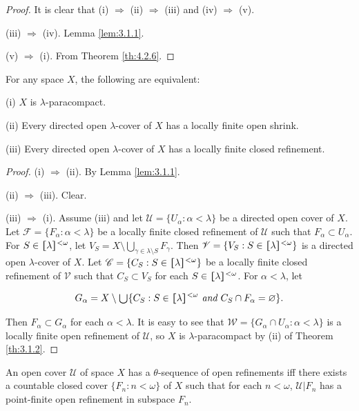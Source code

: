 \documentclass[main.tex]{subfiles}
\begin{document}
\begin{proof}
It is clear that (i) $\Rightarrow$ (ii) $\Rightarrow$ (iii) and (iv) $\Rightarrow$ (v).

(iii) $\Rightarrow$ (iv). Lemma \ref{lem:3.1.1}.

(v) $\Rightarrow$ (i). From Theorem \ref{th:4.2.6}. %
\end{proof} 

{\theorem{}  \label{th:3.1.3} 
For any space $X$, the following are equivalent:

\textup{(i)} $X$ is $\lambda$-paracompact.

\textup{(ii)} Every directed open $\lambda$-cover of $X$ has a locally finite open shrink.

\textup{(iii)} Every directed open $\lambda$-cover of $X$ has a locally finite closed refinement.
}

\begin{proof}
(i) $\Rightarrow$ (ii). By Lemma \ref{lem:3.1.1}.

(ii) $\Rightarrow$ (iii). Clear.

(iii) $\Rightarrow$ (i). Assume (iii) and let $\mathscr{U} = \{U_\alpha: \alpha < \lambda\}$ 
be a directed open cover of $X$. Let 
$\mathscr{F} = \{F_\alpha: \alpha < \lambda\}$ be a locally finite closed refinement of 
$\mathscr{U}$ such that $F_\alpha \subset U_\alpha$. 
For $S \in \hstretch{1.8}{[}\lambda\hstretch{1.8}{]}^{<\omega}$, let 
$V_S = X \setminus \bigcup_{\gamma \in\lambda\setminus S} F_\gamma$. 
Then $\mathscr{V} = \{V_S: S \in \hstretch{1.8}{[}\lambda\hstretch{1.8}{]}^{<\omega}\}$ is a directed open 
$\lambda$-cover of $X$. Let $\mathscr{C} = \{C_S: S \in \hstretch{1.8}{[}\lambda\hstretch{1.8}{]}^{<\omega}\}$ 
be a locally finite closed refinement of $\mathscr{V}$ such that $C_S \subset V_S$ 
for each $S \in \hstretch{1.8}{[}\lambda\hstretch{1.8}{]}^{<\omega}$. For $\alpha < \lambda$, let

$$G_\alpha = X \setminus \raisebox{-2pt}{\scalebox{1.5}{$\cup$}} \{C_S: S \in \hstretch{1.8}{[}\lambda\hstretch{1.8}{]}^{<\omega} \textit{ and }
C_S \cap F_\alpha = \varnothing\}.$$

\noindent Then $F_\alpha \subset G_\alpha$ for each $\alpha < \lambda$. 
It is easy to see that $\mathscr{W} = \{G_\alpha \cap U_\alpha: \alpha < \lambda\}$ 
is a locally finite open refinement of $\mathscr{U}$, so $X$ is 
$\lambda$-paracompact by (ii) of Theorem \ref{th:3.1.2}.
\end{proof}

{\lemma{} \label{lem:3.1.4}
An open cover $\mathscr{U}$ of space $X$ has a $\theta$-sequence of open refinements iff 
there exists a countable closed cover $\{F_n: n <\omega\}$ of $X$ such that 
for each $n < \omega$, $\mathscr{U} \vert{} F_n$ has a point-finite open refinement 
in subspace $F_n$.
}
\end{document}
